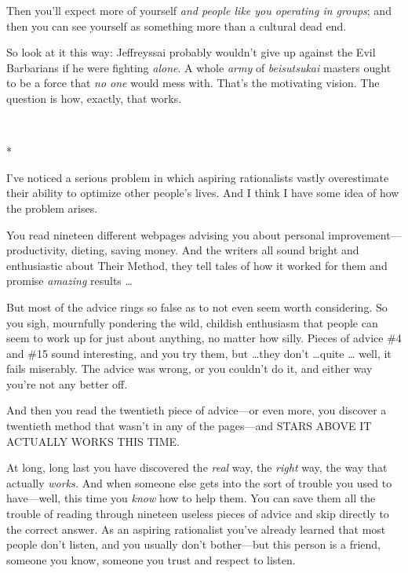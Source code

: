 {
 Then you'll expect more of yourself \textit{and
people like you operating in groups}; and then you can see yourself as
something more than a cultural dead end.}

{
 So look at it this way: Jeffreyssai probably
wouldn't give up against the Evil Barbarians if he were
fighting \textit{alone}. A whole \textit{army} of \textit{beisutsukai}
masters ought to be a force that \textit{no one} would mess with.
That's the motivating vision. The question is how,
exactly, that works.}

{\centering
 \ ~
\par}

{\centering
 *
\par}


{
 I've noticed a serious problem in which aspiring
rationalists vastly overestimate their ability to optimize other
people's lives. And I think I have some idea of how the
problem arises. }

{
 You read nineteen different webpages advising you about personal
improvement---productivity, dieting, saving money. And the writers all
sound bright and enthusiastic about Their Method, they tell tales of
how it worked for them and promise \textit{amazing} results \ldots}

{
 But most of the advice rings so false as to not even seem worth
considering. So you sigh, mournfully pondering the wild, childish
enthusiasm that people can seem to work up for just about anything, no
matter how silly. Pieces of advice \#4 and \#15 sound interesting, and
you try them, but \ldots they don't \ldots quite \ldots
well, it fails miserably. The advice was wrong, or you
couldn't do it, and either way you're
not any better off.}

{
 And then you read the twentieth piece of advice---or even more,
you discover a twentieth method that wasn't in any of
the pages---and STARS ABOVE IT ACTUALLY WORKS THIS TIME.}

{
 At long, long last you have discovered the \textit{real} way, the
\textit{right} way, the way that actually \textit{works.} And when
someone else gets into the sort of trouble you used to have---well,
this time you \textit{know} how to help them. You can save them all the
trouble of reading through nineteen useless pieces of advice and skip
directly to the correct answer. As an aspiring rationalist
you've already learned that most people
don't listen, and you usually don't
bother---but this person is a friend, someone you know, someone you
trust and respect to listen.}

